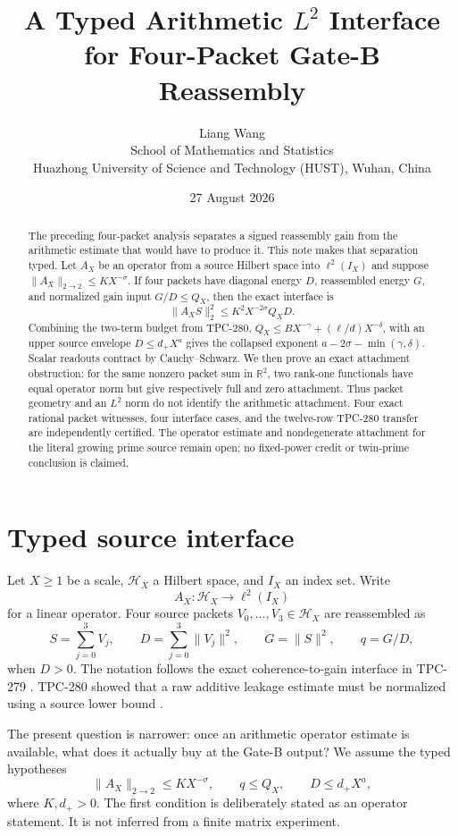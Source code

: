 \documentclass[11pt]{article}
\title{A Typed Arithmetic $L^2$ Interface for Four-Packet Gate-B Reassembly}
\author{Liang Wang\\
School of Mathematics and Statistics\\
Huazhong University of Science and Technology (HUST), Wuhan, China}
\date{27 August 2026}
\begin{document}
\maketitle

\begin{abstract}
The preceding four-packet analysis separates a signed reassembly gain from
the arithmetic estimate that would have to produce it.  This note makes that
separation typed.  Let $A_X$ be an operator from a source Hilbert space into
$\ell^2(I_X)$ and suppose
$\|A_X\|_{2\to2}\le KX^{-\sigma}$.  If four packets have diagonal energy
$D$, reassembled energy $G$, and normalized gain input
$G/D\le Q_X$, then the exact interface is
\[
 \|A_XS\|_2^2\le K^2X^{-2\sigma}Q_XD.
\]
Combining the two-term budget from TPC-280,
$Q_X\le BX^{-\gamma}+(\ell/d)X^{-\delta}$, with an upper source envelope
$D\le d_+X^a$ gives the collapsed exponent
$a-2\sigma-\min(\gamma,\delta)$.  Scalar readouts contract by
Cauchy--Schwarz.  We then prove an exact attachment obstruction: for the same
nonzero packet sum in $\mathbb R^2$, two rank-one functionals have equal
operator norm but give respectively full and zero attachment.  Thus packet
geometry and an $L^2$ norm do not identify the arithmetic attachment.
Four exact rational packet witnesses, four interface cases, and the twelve-row
TPC-280 transfer are independently certified.  The operator estimate and
nondegenerate attachment for the literal growing prime source remain open;
no fixed-power credit or twin-prime conclusion is claimed.
\end{abstract}

\section{Typed source interface}

Let $X\ge1$ be a scale, $\mathcal H_X$ a Hilbert space, and $I_X$ an index
set.  Write
\[
 A_X:\mathcal H_X\longrightarrow\ell^2(I_X)
\]
for a linear operator.  Four source packets $V_0,\ldots,V_3\in\mathcal H_X$
are reassembled as
\[
 S=\sum_{j=0}^3V_j,\qquad
 D=\sum_{j=0}^3\|V_j\|^2,\qquad
 G=\|S\|^2,
 \qquad q=G/D,
\]
when $D>0$.  The notation follows the exact coherence-to-gain interface in
TPC-279 \cite{tpc279}.  TPC-280 showed that a raw additive leakage estimate
must be normalized using a source lower bound \cite{tpc280}.

The present question is narrower: once an arithmetic operator estimate is
available, what does it actually buy at the Gate-B output?  We assume the
typed hypotheses
\begin{equation}
 \|A_X\|_{2\to2}\le KX^{-\sigma},\qquad
 q\le Q_X,\qquad D\le d_+X^a,
 \label{eq:hyp}
\end{equation}
where $K,d_+>0$.  The first condition is deliberately stated as an operator
statement.  It is not inferred from a finite matrix experiment.
\end{document}
